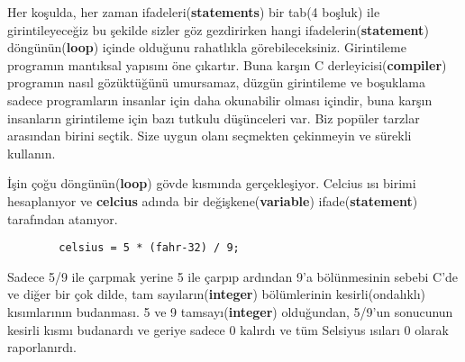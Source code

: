 \documentclass[a4paper,12pt,oneside]{book}
\begin{document}
Her koşulda, her zaman ifadeleri(\textbf{statements}) bir tab(4 boşluk) ile girintileyeceğiz bu şekilde sizler göz gezdirirken hangi ifadelerin(\textbf{statement}) döngünün(\textbf{loop}) içinde olduğunu rahatlıkla görebileceksiniz. Girintileme programın mantıksal yapısını öne çıkartır. Buna karşın C derleyicisi(\textbf{compiler}) programın nasıl gözüktüğünü umursamaz, düzgün girintileme ve boşuklama sadece programların insanlar için daha okunabilir olması içindir, buna karşın insanların girintileme için bazı tutkulu düşünceleri var. Biz popüler tarzlar arasından birini seçtik. Size uygun olanı seçmekten çekinmeyin ve sürekli kullanın. \pagebreak
\par İşin çoğu döngünün(\textbf{loop}) gövde kısmında gerçekleşiyor. Celcius ısı birimi hesaplanıyor ve \textbf{celcius} adında bir değişkene(\textbf{variable}) ifade(\textbf{statement}) tarafından atanıyor.
\begin{lstlisting}
        celsius = 5 * (fahr-32) / 9;
\end{lstlisting}
Sadece 5/9 ile çarpmak yerine 5 ile çarpıp ardından 9'a bölünmesinin sebebi C'de ve diğer bir çok dilde, tam sayıların(\textbf{integer}) bölümlerinin kesirli(ondalıklı) kısımlarının budanması. 5 ve 9 tamsayı(\textbf{integer}) olduğundan, 5/9'un sonucunun kesirli kısmı budanardı ve geriye sadece 0 kalırdı ve tüm Selsiyus ısıları 0 olarak raporlanırdı.
\end{document}
